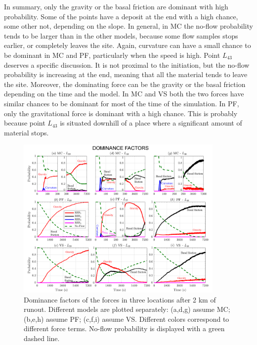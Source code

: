 \documentclass{article}
\begin{document}
In summary, only the gravity or the basal friction are dominant with high probability. Some of the points have a deposit at the end with a high chance, some other not, depending on the slope. In general, in MC the no-flow probability tends to be larger than in the other models, because some flow samples stops earlier, or completely leaves the site. Again, curvature can have a small chance to be dominant in MC and PF, particularly when the speed is high. Point $L_{43}$ deserves a specific discussion. It is not proximal to the initiation, but the no-flow probability is increasing at the end, meaning that all the material tends to leave the site. Moreover, the dominating force can be the gravity or the basal friction depending on the time and the model. In MC and VS both the two forces have similar chances to be dominant for  most of the time of the simulation. In PF, only the gravitational force is dominant with a high chance. This is probably because point $L_{43}$ is situated downhill of a place where a significant amount of material stops.
\begin{figure}[H]
         \centering
        \includegraphics[width=0.90\textwidth]{Pr2_total.png}
        \caption{Dominance factors of the forces in three locations after 2 km of runout. Different models are plotted separately: (a,d,g) assume MC; (b,e,h) assume PF; (c,f,i) assume VS. Different colors correspond to different force terms. No-flow probability is displayed with a green dashed line.}
        \label{fig:Colima-Pr2}
\end{figure}
\end{document}
